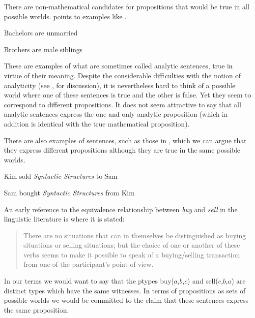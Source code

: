 There are
non-mathematical candidates for propositions that would be true
in all possible worlds.  \cite{King2014} points to examples like
\nexteg{}.
\begin{ex} 
\begin{subex} 
 
\item Bachelors are unmarried
 
\item Brothers are male siblings  
 
\end{subex} 
   
\end{ex} 
These are examples of what are sometimes called analytic sentences,
true in virtue of their meaning.  Despite the considerable
difficulties with the notion of analyticity (see \citealp{Rey2015}, for
discussion), it is nevertheless hard to think of a possible
world where one of these sentences is true and the other is false.
Yet they seem to correspond to different propositions.  It does not
seem attractive to say that all analytic sentences express the one and
only analytic proposition (which in addition is identical with the
true mathematical proposition).

There are also examples of sentences, such as those in \nexteg{}, which we can argue that they
express different propositions although they are true in the same
possible worlds.
\begin{ex} 
\begin{subex} 
 
\item Kim sold \textit{Syntactic Structures} to Sam 
 
\item Sam bought \textit{Syntactic Structures} from Kim 
 
\end{subex} 
 \label{ex:buysell}  
\end{ex} 
An early reference to the equivalence relationship between
\textit{buy} and \textit{sell} in the linguistic literature is
\cite{Fillmore1970} where it is stated:  
\begin{quote}
There are no situations that can in themselves be distinguished as
buying situations or selling situations; but the choice of one or
another of these verbs seems to make it possible to speak of a
buying/selling transaction from one of the participant's point of view.
\end{quote} 
In our terms we would want to say that the ptypes buy($a$,$b$,$c$) and
sell($c$,$b$,$a$) are distinct types which have the same witnesses.
In terms of propositions as sets of possible worlds we would be
committed to the claim that these sentences express the same proposition.    

